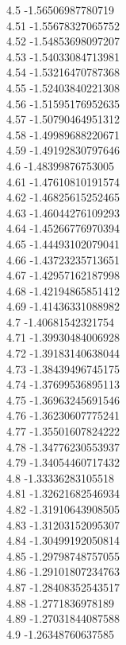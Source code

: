 {4.5	-1.56506987780719\\
4.51	-1.55678327065752\\
4.52	-1.54853698097207\\
4.53	-1.54033084713981\\
4.54	-1.53216470787368\\
4.55	-1.52403840221308\\
4.56	-1.51595176952635\\
4.57	-1.50790464951312\\
4.58	-1.49989688220671\\
4.59	-1.49192830797646\\
4.6	-1.48399876753005\\
4.61	-1.47610810191574\\
4.62	-1.46825615252465\\
4.63	-1.46044276109293\\
4.64	-1.45266776970394\\
4.65	-1.44493102079041\\
4.66	-1.43723235713651\\
4.67	-1.42957162187998\\
4.68	-1.42194865851412\\
4.69	-1.41436331088982\\
4.7	-1.40681542321754\\
4.71	-1.39930484006928\\
4.72	-1.39183140638044\\
4.73	-1.38439496745175\\
4.74	-1.37699536895113\\
4.75	-1.36963245691546\\
4.76	-1.36230607775241\\
4.77	-1.35501607824222\\
4.78	-1.34776230553937\\
4.79	-1.34054460717432\\
4.8	-1.33336283105518\\
4.81	-1.32621682546934\\
4.82	-1.31910643908505\\
4.83	-1.31203152095307\\
4.84	-1.30499192050814\\
4.85	-1.29798748757055\\
4.86	-1.29101807234763\\
4.87	-1.28408352543517\\
4.88	-1.2771836978189\\
4.89	-1.27031844087588\\
4.9	-1.26348760637585\\
}
